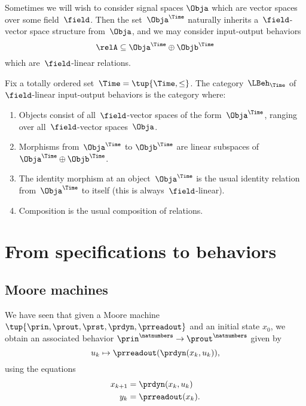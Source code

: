 Sometimes we will wish to consider signal spaces $\Obja$ which are vector spaces over some field~$\field$.
Then the set~$\Obja^\Time$ naturally inherits a~$\field$-vector space structure from~$\Obja$, and we may consider input-output behaviors
\begin{equation*}
    \relA \subseteq \Obja^\Time \oplus \Objb^\Time
\end{equation*}
which are~$\field$-linear relations.

\begin{definition}
    Fix a totally ordered set~$\Time = \tup{\Time, \leq}$.
    The category~$\LBeh_\Time$ of~$\field$-linear input-output behaviors is the category where:
    \begin{enumerate}
        \item Objects consist of all~$\field$-vector spaces of the form~$\Obja^\Time$, ranging over all~$\field$-vector spaces~$\Obja$.
        \item Morphisms from~$\Obja^\Time$ to $\Objb^\Time$ are linear subspaces of~$\Obja^\Time \oplus \Objb^\Time$.
        \item The identity morphism at an object~$\Obja^\Time$ is the usual identity relation from~$\Obja^\Time$ to itself (this is always~$\field$-linear).
        \item Composition is the usual composition of relations.
    \end{enumerate}
\end{definition}

\section{From specifications to behaviors}


\subsection{Moore machines}

We have seen that given a Moore machine $\tup{\prin, \prout, \prst, \prdyn, \prreadout}$ and an initial state $x_0$, we obtain an associated behavior $\prin^\natnumbers \to  \prout^\natnumbers$ given by
\begin{equation}
    u_k \mapsto \prreadout(\prdyn(x_k, u_k)),
\end{equation}
using the equations
\begin{align}
    x_{k+1} & = \prdyn(x_k, u_k) \\
    y_{k}   & = \prreadout(x_{k}).
\end{align}

